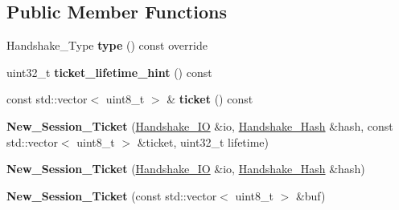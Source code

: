 \subsection*{Public Member Functions}
\begin{DoxyCompactItemize}
\item 
\mbox{\label{class_botan_1_1_t_l_s_1_1_new___session___ticket_a0b946a9fcc8451809169dcf1a48d1992}} 
Handshake\+\_\+\+Type {\bfseries type} () const override
\item 
\mbox{\label{class_botan_1_1_t_l_s_1_1_new___session___ticket_ad595f84713fd3c08706953a905c0982e}} 
uint32\+\_\+t {\bfseries ticket\+\_\+lifetime\+\_\+hint} () const
\item 
\mbox{\label{class_botan_1_1_t_l_s_1_1_new___session___ticket_a459f4239e5cf5d5d2e30d55bc64e6ff2}} 
const std\+::vector$<$ uint8\+\_\+t $>$ \& {\bfseries ticket} () const
\item 
\mbox{\label{class_botan_1_1_t_l_s_1_1_new___session___ticket_ac911079cf8e83c39e9fd2a0b0364e2d9}} 
{\bfseries New\+\_\+\+Session\+\_\+\+Ticket} (\mbox{\hyperlink{class_botan_1_1_t_l_s_1_1_handshake___i_o}{Handshake\+\_\+\+IO}} \&io, \mbox{\hyperlink{class_botan_1_1_t_l_s_1_1_handshake___hash}{Handshake\+\_\+\+Hash}} \&hash, const std\+::vector$<$ uint8\+\_\+t $>$ \&ticket, uint32\+\_\+t lifetime)
\item 
\mbox{\label{class_botan_1_1_t_l_s_1_1_new___session___ticket_ad2c54684e67deadda3d664b13a0d25a9}} 
{\bfseries New\+\_\+\+Session\+\_\+\+Ticket} (\mbox{\hyperlink{class_botan_1_1_t_l_s_1_1_handshake___i_o}{Handshake\+\_\+\+IO}} \&io, \mbox{\hyperlink{class_botan_1_1_t_l_s_1_1_handshake___hash}{Handshake\+\_\+\+Hash}} \&hash)
\item 
\mbox{\label{class_botan_1_1_t_l_s_1_1_new___session___ticket_a0019e165e0310496616914de0308a164}} 
{\bfseries New\+\_\+\+Session\+\_\+\+Ticket} (const std\+::vector$<$ uint8\+\_\+t $>$ \&buf)
\end{DoxyCompactItemize}


